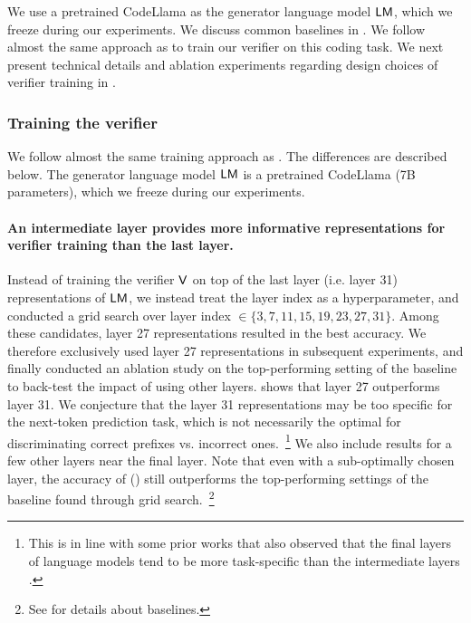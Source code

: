 We use a pretrained CodeLlama \citep{roziere2023code}
as the generator language model $\mathsf{LM}$, 
which we freeze during our experiments.
We discuss common baselines in .
We follow almost the same approach as  to train our verifier on this coding task.
We next present technical details and ablation experiments regarding design choices of verifier training in .





\subsubsection{Training the verifier}
\label{sec:experiments:codellama:verifier}

We follow almost the same training approach as .
The differences are described below.
The generator language model $\mathsf{LM}$ is a pretrained CodeLlama \citep{roziere2023code} (7B parameters), which we freeze during our experiments.

\paragraph{An intermediate layer provides more informative representations for verifier training than the last layer.}
Instead of training the verifier $\mathsf{V}$ on top of the last layer (i.e. layer 31) representations of $\mathsf{LM}$,
we instead treat the layer index as a hyperparameter, 
and conducted a grid search over layer index $\in \{ 3, 7, 11, 15, 19, 23, 27, 31\}$.
Among these candidates, layer 27 representations resulted in the best accuracy.
We therefore exclusively used layer 27 representations in subsequent experiments,
and finally conducted an ablation study on the top-performing setting of the baseline to back-test the impact of using other layers.
 shows that layer 27 outperforms layer 31.
We conjecture that the layer 31 representations may be too specific for the next-token prediction task,
which is not necessarily the optimal for discriminating correct prefixes vs. incorrect ones.~\footnote{
This is in line with some prior works that also observed that 
the final layers of language models tend to be more task-specific than the intermediate layers \citep{liu2019linguistic, kovaleva2019revealing, rogers2021primer}.
}
We also include results for a few other layers near the final layer.
Note that even with a sub-optimally chosen layer,
the accuracy of \algoName () 
still outperforms the top-performing settings of the baseline found through grid search.~\footnote{
See  for details about baselines.
}

